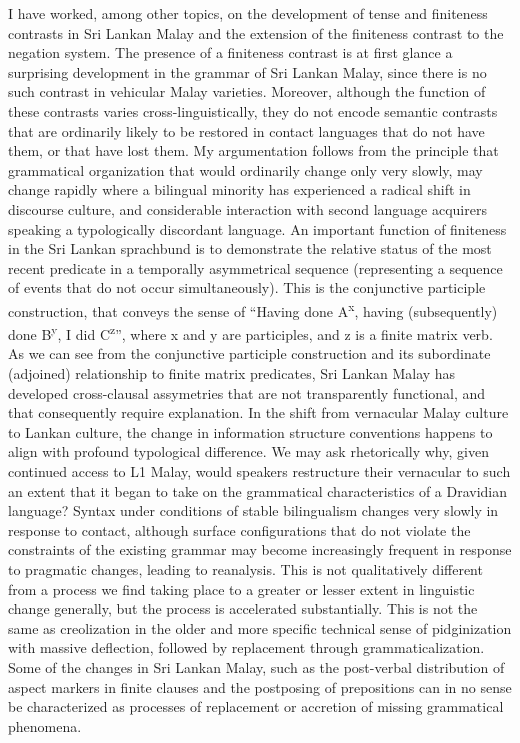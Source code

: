 I have worked, among other topics, on the development of tense and finiteness contrasts in Sri Lankan Malay and the extension of the finiteness contrast to the negation system. The presence of a finiteness contrast is at first glance a surprising development in the grammar of Sri Lankan Malay, since there is no such contrast in vehicular Malay varieties. Moreover, although the function of these contrasts varies cross-linguistically, they do not encode semantic contrasts that are ordinarily likely to be restored in contact languages that do not have them, or that have lost them. My argumentation follows from the principle that grammatical organization that would ordinarily change only very slowly, may change rapidly where a bilingual minority has experienced a radical shift in discourse culture, and considerable interaction with second language acquirers speaking a typologically discordant language. An important function of finiteness in the Sri Lankan sprachbund is to demonstrate the relative status of the most recent predicate in a temporally asymmetrical sequence (representing a sequence of events that do not occur simultaneously). This is the conjunctive participle construction, that conveys the sense of ``Having done A\textsuperscript{x}, having (subsequently) done B\textsuperscript{y}, I did C\textsuperscript{z}'', where x and y are participles, and z is a finite matrix verb. As we can see from the conjunctive participle construction and its subordinate (adjoined) relationship to finite matrix predicates, Sri Lankan Malay has developed cross-clausal assymetries that are not transparently functional, and that consequently require explanation. In the shift from vernacular Malay culture to Lankan culture, the change in information structure conventions happens to align with profound typological difference. We may ask rhetorically why, given continued access to L1 Malay, would speakers restructure their vernacular to such an extent that it began to take on the grammatical characteristics of a Dravidian language? Syntax under conditions of stable bilingualism changes very slowly in response to contact, although surface configurations that do not violate the constraints of the existing grammar may become increasingly frequent in response to pragmatic changes, leading to reanalysis. This is not qualitatively different from a process we find taking place to a greater or lesser extent in linguistic change generally, but the process is accelerated substantially. This is not the same as creolization in the older and more specific technical sense of pidginization with massive deflection, followed by replacement through grammaticalization. Some of the changes in Sri Lankan Malay, such as the post-verbal distribution of aspect markers in finite clauses and the postposing of prepositions can in no sense be characterized as processes of replacement or accretion of missing grammatical phenomena.  
